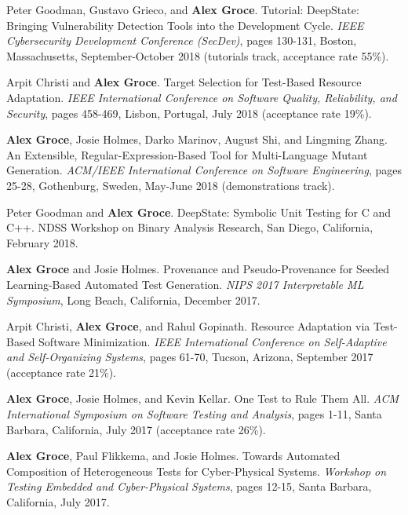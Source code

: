 \documentclass[ComputerScience]{vita}
\begin{document}
\begin{vita}
\begin{Refereed Conference and Workshop Publications}
\item Peter Goodman, Gustavo Grieco,  and {\bf Alex Groce}. 
\newblock Tutorial: DeepState: Bringing Vulnerability Detection Tools 
into the Development Cycle. 
\newblock \emph{IEEE Cybersecurity Development Conference (SecDev)},
pages 130-131, Boston, Massachusetts, September-October 2018 (tutorials track, 
acceptance rate 55\%). 

\item Arpit Christi and {\bf Alex Groce}.
\newblock Target Selection for Test-Based Resource Adaptation.
\newblock \emph{IEEE International Conference on Software Quality,
  Reliability, and Security}, pages 458-469, 
Lisbon, Portugal, July 2018 (acceptance rate 19\%).

\item {\bf Alex Groce},  Josie Holmes, Darko Marinov, August Shi, and Lingming Zhang.
\newblock An Extensible, Regular-Expression-Based Tool for Multi-Language Mutant Generation.
\newblock \emph{ACM/IEEE International Conference on Software
  Engineering}, pages 25-28, Gothenburg, Sweden, May-June 2018 (demonstrations track).

\item Peter Goodman and {\bf Alex Groce}.
\newblock DeepState: Symbolic Unit Testing for C and C++.
\newblock NDSS Workshop on Binary Analysis Research, San Diego, California, February 2018.

\item {\bf Alex Groce} and Josie Holmes.
\newblock Provenance and Pseudo-Provenance for Seeded Learning-Based Automated Test Generation.
\newblock \emph{NIPS 2017 Interpretable ML Symposium}, Long Beach, California, December 2017.

\item Arpit Christi, {\bf Alex Groce}, and Rahul Gopinath.
\newblock Resource Adaptation via Test-Based Software Minimization.
\newblock \emph{IEEE International Conference on Self-Adaptive and Self-Organizing Systems}, pages 61-70, Tucson, Arizona, September 2017 (acceptance rate 21\%).

\item {\bf Alex Groce}, Josie Holmes, and Kevin Kellar.
\newblock One Test to Rule Them All.
\newblock \emph{ACM International Symposium on Software Testing and Analysis}, pages 1-11, Santa Barbara, California, July 2017 (acceptance rate 26\%).

\item {\bf Alex Groce}, Paul Flikkema, and Josie Holmes.
\newblock Towards Automated Composition of Heterogeneous Tests for Cyber-Physical Systems.
\newblock \emph{Workshop on Testing Embedded and Cyber-Physical Systems}, pages 12-15, Santa Barbara, California, July 2017.


\end{Refereed Conference and Workshop Publications}
\end{vita}
\end{document}
